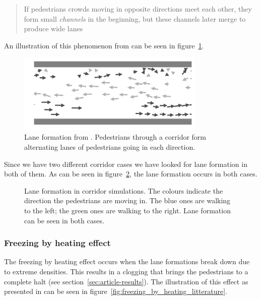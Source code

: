 \begin{quote}
    If pedestrians crowds moving in opposite directions meet each other, they 
    form small \emph{channels} in the beginning, but these channels later 
    merge to produce wide lanes
\end{quote}

An illustration of this phenomenon from \cite{lanes} can be seen in 
figure~\ref{fig:lanes-literature}. 

\begin{figure}[h]
    \centering
    \includegraphics[width=0.8\textwidth]{Figures/flow_lanes_litterature.png}
    \caption[Lane formation from \cite{lanes}]{Lane formation from 
    \cite{lanes}. Pedestrians through a corridor form alternating lanes of 
    pedestrians going in each direction.}
    \label{fig:lanes-literature}
\end{figure}

Since we have two different corridor cases we have looked for lane
formation in both of them. As can be seen in figure~\ref{fig:laneformation}, 
the lane formation occurs in both cases.

\begin{figure}[h]
    \centering
    \caption[Lane formation in corridor simulations]{Lane formation in 
    corridor simulations. The colours indicate the direction the pedestrians 
    are moving in. The blue ones are walking to the left; the green ones are 
    walking to the right. Lane formation can be seen in both cases. }
    \label{fig:laneformation}
\end{figure}

\subsubsection{Freezing by heating effect}
The freezing by heating effect occurs when the lane formations break down due 
to extreme densities. This results in a clogging that brings the pedestrians 
to a complete halt (see section~\ref{sec:article-results}).  The illustration 
of this effect as presented in \cite{oscil} can be seen in 
figure~\ref{fig:freezing_by_heating_litterature}.

